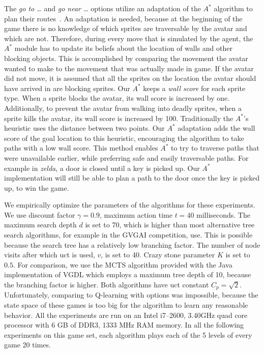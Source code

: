 The \emph{go to \ldots} and \emph{go near \ldots} options utilize an adaptation
of the $A^*$ algorithm to plan their routes~\cite{hart1968formal}. An
adaptation is needed, because at the beginning of the game there is no knowledge
of which sprites are traversable by the avatar and which are not. Therefore,
during every move that is simulated by the agent, the $A^*$ module has to
update its beliefs about the location of walls and other blocking objects. This
is accomplished by comparing the movement the avatar wanted to make to the
movement that was actually made in game. If the avatar did not move, it is
assumed that all the sprites on the location the avatar should have arrived in
are blocking sprites. Our $A^*$ keeps a \emph{wall score} for each sprite type.
When a sprite blocks the avatar, its wall score is increased by one.
Additionally, to prevent the avatar from walking into deadly sprites, when a
sprite kills the avatar, its wall score is increased by 100.  Traditionally the
$A^*$'s heuristic uses the distance between two points. Our $A^*$ adaptation
adds the wall score of the goal location to this heuristic, encouraging the
algorithm to take paths with a low wall score. This method enables $A^*$ to
try to traverse paths that were unavailable earlier, while preferring safe and
easily traversable paths. For example in \textit{zelda}, a door is closed until
a key is picked up. Our $A^*$ implementation will still be able to plan a path
to the door once the key is picked up, to win the game.

We empirically optimize the parameters of the algorithms for these experiments.
We use discount factor $\gamma = 0.9$, maximum action time $t = 40$
milliseconds. The maximum search depth $d$ is set to 70, which is higher than
most alternative tree search algorithms, for example in the GVGAI competition,
use. This is possible because the search tree has a relatively low branching
factor. The number of node visits after which \textsf{uct} is used, $v$, is set
to 40. Crazy stone parameter $K$ is set to $0.5$.  For comparison, we use the
MCTS algorithm provided with the Java implementation of VGDL which employs a
maximum tree depth of 10, because the branching factor is higher. Both
algorithms have \textsf{uct} constant $C_p = \sqrt{2}$. Unfortunately, comparing
to Q-learning with options was impossible, because the state space of these
games is too big for the algorithm to learn any reasonable behavior. All the
experiments are run on an Intel i7--2600, 3.40GHz quad core processor with 6 GB
of DDR3, 1333 MHz RAM memory. In all the following experiments on this game set,
each algorithm plays each of the 5 levels of every game 20 times.

